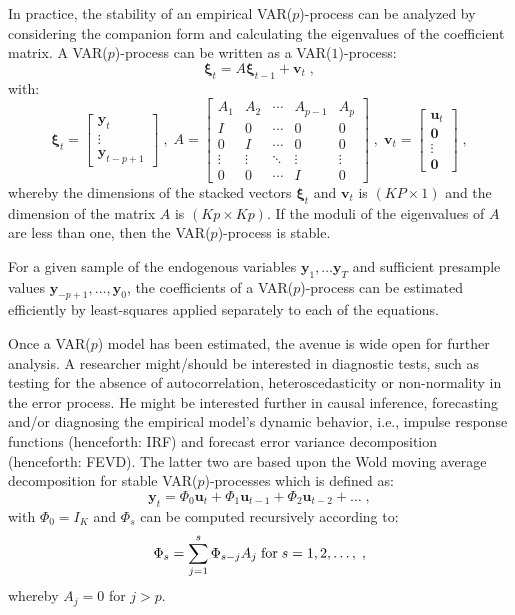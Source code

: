 \documentclass[nojss]{jss}
\begin{document}
In practice, the stability of an empirical VAR($p$)-process can be
analyzed by considering the companion form and calculating the
eigenvalues of the coefficient matrix. A VAR($p$)-process can be
written as a VAR($1$)-process: 
\begin{equation}
\label{eq3}
\bm{\xi}_t = A \bm{\xi}_{t-1} + \bm{v}_t \; ,
\end{equation}
with:
\begin{equation}
\label{eq4}
\bm{\xi}_t =  
\begin{bmatrix}
\bm{y}_t \\
\vdots \\
\bm{y}_{t-p+1}
\end{bmatrix}
\; , \;
A = 
\begin{bmatrix}
A_1    & A_2    & \cdots & A_{p-1} & A_{p}  \\
I      & 0      & \cdots & 0       & 0      \\
0      & I      & \cdots & 0       & 0      \\
\vdots & \vdots & \ddots & \vdots  & \vdots \\
0      & 0      & \cdots & I       & 0
\end{bmatrix}
\; , \;
\bm{v}_t = 
\begin{bmatrix}
\bm{u}_t \\
\bm{0} \\
\vdots \\
\bm{0}
\end{bmatrix}
\; ,
\end{equation}
whereby the dimensions of the stacked vectors $\bm{\xi}_t$ and
$\bm{v}_t$ is $(KP \times 1)$ and the dimension of the matrix $A$
is $(Kp \times Kp)$. If the moduli of the eigenvalues of $A$
are less than one, then the VAR($p$)-process is stable.

For a given sample of the endogenous variables $\bm{y}_1, \ldots
\bm{y}_T$ and sufficient presample values $\bm{y}_{-p+1},
\ldots, \bm{y}_0$, the coefficients of a VAR($p$)-process can be
estimated efficiently by least-squares applied separately to each of
the equations.

Once a VAR($p$) model has been estimated, the avenue is wide open for
further analysis. A researcher might/should be interested in
diagnostic tests, such as testing for the absence of autocorrelation,
heteroscedasticity or non-normality in the error process. He might be
interested further in causal inference, forecasting and/or diagnosing
the empirical model's dynamic behavior, i.e., impulse response
functions (henceforth: IRF) and forecast error variance decomposition
(henceforth: FEVD). The latter two are based upon the Wold
moving average decomposition for stable VAR($p$)-processes which is
defined as: 
\begin{equation}
\label{eq5}
\bm{y}_t = \Phi_0 \bm{u}_t + \Phi_1 \bm{u}_{t-1} + \Phi_2
\bm{u}_{t-2} + \ldots \; , 
\end{equation}
with $\Phi_0 = I_K$ and $\Phi_s$ can be computed recursively according to:
\begin{equation}
\label{eq6}
\Phi_s = \sum_{j=1}^s \Phi_{s-j} A_j \; \hbox{for} \; s = 1, 2, \ldots , \; ,
\end{equation}
whereby $A_j = 0$ for $j > p$.
\end{document}
